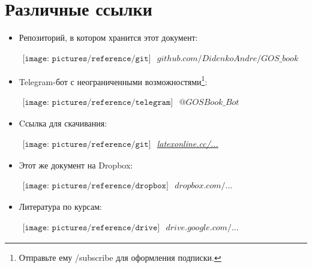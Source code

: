 {\let\clearpage\relax\chapter{Различные ссылки}}
\begin{itemize}
\item

Репозиторий, в котором хранится этот документ:

$
\begin{array}{l}
\texttt{[image: pictures/reference/git]}
\end{array}
$ \href{https://github.com/DidenkoAndre/GOS_book}{$github.com/DidenkoAndre/GOS\_book$}

\item

Telegram-бот с неограниченными возможностями\footnote{Отправьте ему \textsf{/subscribe} для оформления подписки.}:

$
\begin{array}{l}
\texttt{[image: pictures/reference/telegram]}
\end{array}
$
\href{https://t.me/GOSBook_Bot}{\textcolor{Purplemountainmajesty}{$@GOSBook\_Bot$}} 

\item 

Cсылка для скачивания:

$
\begin{array}{l}
\texttt{[image: pictures/reference/git]}
\end{array}
$
\href{http://latexonline.cc/compile?git=https://github.com/DidenkoAndre/GOS_book&target=_main.tex}{\large \textcolor{Purplemountainmajesty}{\textit{latexonline.cc/...}}}


\item

Этот же документ на Dropbox:

$
\begin{array}{l}
\texttt{[image: pictures/reference/dropbox]}
\end{array}
$ \href{https://www.dropbox.com/sh/7e5mfj8q68o2ipp/AAD8XvpZhiJzFbEh_IeH305ia?dl=0&preview=GOSBook.pdf}{$dropbox.com/...$}

\item
Литература по курсам:

$
\begin{array}{l}
\texttt{[image: pictures/reference/drive]}
\end{array}
$
\href{https://drive.google.com/drive/u/0/folders/0BzuzEyNkpwYDcENXcV9jNWdwVlU}{$drive.google.com/...$}


\end{itemize}

